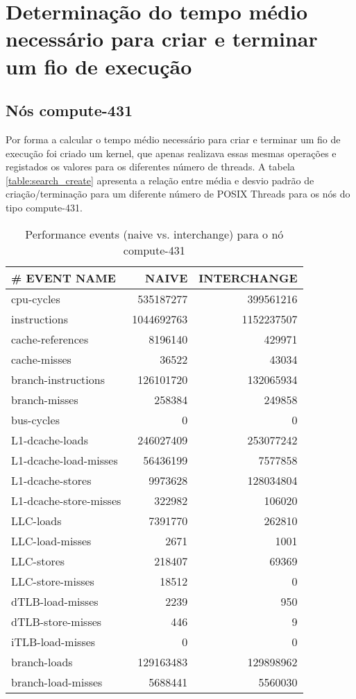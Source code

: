 \documentclass[conference,compsoc]{IEEEtran}
\begin{document}
  \section{Determinação do tempo médio necessário para criar e  terminar um fio de execução}
  \subsection{Nós compute-431}
  Por forma a calcular o tempo médio necessário para criar e terminar um fio de execução foi criado um kernel, que apenas realizava essas mesmas operações e registados os valores para os diferentes número de threads. A tabela \ref{table:search_create} apresenta a relação entre média e desvio padrão de criação/terminação para um diferente número de POSIX Threads para os nós do tipo compute-431.


  \begin{table}[H]
  \caption{Performance events (naive vs. interchange) para o nó compute-431}
  \label{table:search_events}
  \centering
  \begin{tabular}{ | l | r | r |   }

  \hline
  \# EVENT NAME	 & NAIVE  & INTERCHANGE \\ \hline 
  cpu-cycles  & 535187277  & 399561216         \\ \hline       
  instructions &       1044692763 &      1152237507      \\ \hline
  cache-references &      8196140 &    429971      \\ \hline
  cache-misses     &    36522 &     43034      \\ \hline
  branch-instructions & 126101720 & 132065934      \\ \hline
  branch-misses     &   258384 &  249858      \\ \hline
  bus-cycles       &       0 &    0      \\ \hline
   L1-dcache-loads  &  246027409 & 253077242     \\ \hline
 L1-dcache-load-misses & 56436199 & 7577858   \\ \hline
  L1-dcache-stores   &  9973628 & 128034804     \\ \hline
  L1-dcache-store-misses & 322982 &  106020     \\ \hline
  LLC-loads           &    7391770 & 262810     \\ \hline
  LLC-load-misses      &  2671 &  1001     \\ \hline
  LLC-stores          &  218407 & 69369     \\ \hline
  LLC-store-misses    &   18512 &    0     \\ \hline
  dTLB-load-misses    &   2239 & 950     \\ \hline
  dTLB-store-misses   &    446 &  9     \\ \hline
  iTLB-load-misses   &   0 &   0     \\ \hline
  branch-loads   & 129163483 & 129898962  \\ \hline    
  branch-load-misses &  5688441 & 5560030      \\ \hline
  \end{tabular}
  \end{table}
  
\end{document}
